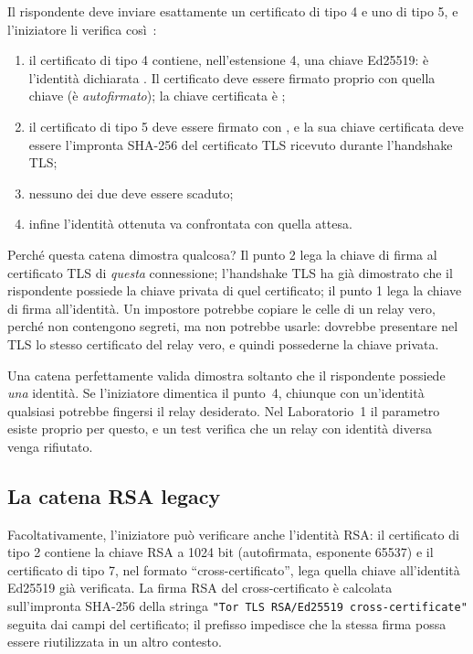 Il rispondente deve inviare esattamente un certificato di tipo 4 e uno di tipo 5, e l'iniziatore li verifica così~:
\begin{enumerate}
  \item il certificato di tipo 4 contiene, nell'estensione 4, una chiave Ed25519: è l'identità dichiarata . Il certificato deve essere firmato proprio con quella chiave (è \emph{autofirmato}); la chiave certificata è ;
  \item il certificato di tipo 5 deve essere firmato con , e la sua chiave certificata deve essere l'impronta SHA-256 del certificato TLS ricevuto durante l'handshake TLS;
  \item nessuno dei due deve essere scaduto;
  \item infine l'identità ottenuta va confrontata con quella attesa.
\end{enumerate}

Perché questa catena dimostra qualcosa? Il punto 2 lega la chiave di firma al certificato TLS di \emph{questa} connessione; l'handshake TLS ha già dimostrato che il rispondente possiede la chiave privata di quel certificato; il punto 1 lega la chiave di firma all'identità. Un impostore potrebbe copiare le celle  di un relay vero, perché non contengono segreti, ma non potrebbe usarle: dovrebbe presentare nel TLS lo stesso certificato del relay vero, e quindi possederne la chiave privata.

\begin{attenzione}
Una catena perfettamente valida dimostra soltanto che il rispondente possiede \emph{una} identità. Se l'iniziatore dimentica il punto~4, chiunque con un'identità qualsiasi potrebbe fingersi il relay desiderato. Nel Laboratorio~1 il parametro  esiste proprio per questo, e un test verifica che un relay con identità diversa venga rifiutato.
\end{attenzione}

\subsection{La catena RSA legacy}

Facoltativamente, l'iniziatore può verificare anche l'identità RSA: il certificato di tipo 2 contiene la chiave RSA a 1024 bit (autofirmata, esponente 65537) e il certificato di tipo 7, nel formato \enquote{cross-certificato}, lega quella chiave all'identità Ed25519 già verificata. La firma RSA del cross-certificato è calcolata sull'impronta SHA-256 della stringa \texttt{"Tor TLS RSA/Ed25519 cross-certificate"} seguita dai campi del certificato; il prefisso impedisce che la stessa firma possa essere riutilizzata in un altro contesto.

